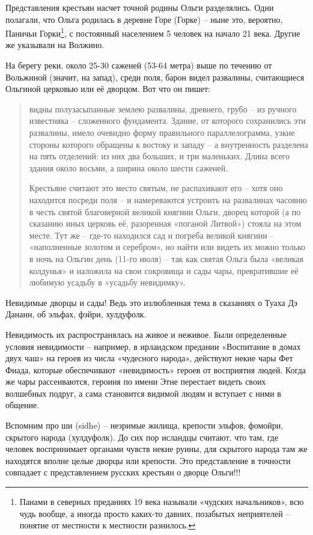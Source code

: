 Представления крестьян насчет точной родины Ольги разделялись. Одни полагали, что Ольга родилась в деревне Горе (Горке) – ныне это, вероятно, Паничьи Горки\footnote{Панами в северных преданиях 19 века называли «чудских начальников», всю чудь вообще, а иногда просто каких-то давних, позабытых неприятелей – понятие от местности к местности разнилось.}, с постоянный населением 5 человек на начало 21 века. Другие же указывали на Волжино.

На берегу реки, около 25-30 саженей (53-64 метра) выше по течению от Вольжиной (значит, на запад), среди поля, барон видел развалины, считающиеся Ольгиной церковью или её дворцом. Вот что он пишет:

\begin{quotation}
видны полузасыпанные землею развалины, древнего, грубо – из ручного известняка – сложенного фундамента. Здание, от которого сохранились эти развалины, имело очевидно форму правильного параллелограмма, узкие стороны которого обращены к востоку и западу – а внутренность разделена на пять отделений: из них два больших, и три маленьких. Длина всего здания около восьми, а ширина около шести саженей.

Крестьяне считают это место святым, не распахивают его – хотя оно находится посреди поля – и намереваются устроить на развалинах часовню в честь святой благоверной великой княгини Ольги, дворец которой (а по сказанию иных церковь её, разоренная «поганой Литвой») стояла на этом месте. Тут же – где-то находился сад и погреба великой княгини – «наполненные золотом и серебром», но найти или видеть их можно только в ночь на Ольгин день (11-го июля) – так как святая Ольга была «великая колдунья» и наложила на свои сокровища и сады чары, превратившие её любимую усадьбу в «усадьбу невидимку».
\end{quotation}

Невидимые дворцы и сады! Ведь это излюбленная тема в сказаниях о Туаха Дэ Дананн, об эльфах, фэйри, хулдуфолк.

Невидимость их распространялась на живое и неживое. Были определенные условия невидимости – например, в ирландском предании «Воспитание в домах двух чаш» на героев из числа «чудесного народа», действуют некие чары Фет Фиада, которые обеспечивают «невидимость» героев от восприятия людей. Когда же чары рассеиваются, героиня по имени Этне перестает видеть своих волшебных подруг, а сама становится видимой людям и вступает с ними в общение.

Вспомним про ши (sidhe) – незримые жилища, крепости эльфов, фомойри, скрытого народа (хулдуфолк). До сих пор исландцы считают, что там, где человек воспринимает органами чувств некие руины, для скрытого народа там же находятся вполне целые дворцы или крепости. Это представление в точности совпадает с представлением русских крестьян о дворце Ольги!!!

